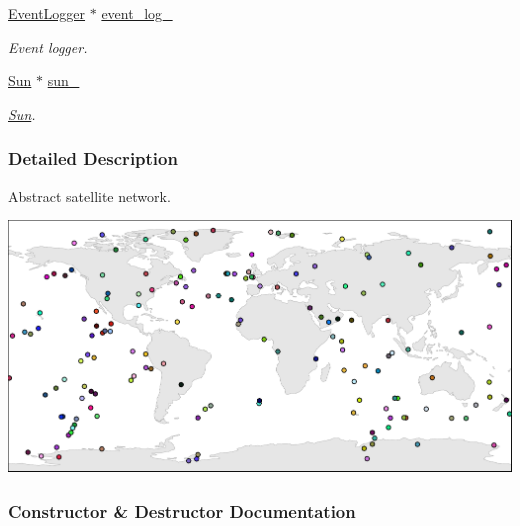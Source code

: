 \begin{DoxyCompactItemize}
\mbox{\label{classosse_1_1collaborate_1_1_observing_system_ac3f97c3eb20163b20076f35ce78175ee}} 
\hyperlink{classosse_1_1collaborate_1_1_event_logger}{Event\+Logger} $\ast$ \hyperlink{classosse_1_1collaborate_1_1_observing_system_ac3f97c3eb20163b20076f35ce78175ee}{event\+\_\+log\+\_\+}
\begin{DoxyCompactList}\small\item\em Event logger. \end{DoxyCompactList}\item 
\mbox{\label{classosse_1_1collaborate_1_1_observing_system_aa6de5a15a22658a10220b163ee1d21d0}} 
\hyperlink{classosse_1_1collaborate_1_1_sun}{Sun} $\ast$ \hyperlink{classosse_1_1collaborate_1_1_observing_system_aa6de5a15a22658a10220b163ee1d21d0}{sun\+\_\+}
\begin{DoxyCompactList}\small\item\em \hyperlink{classosse_1_1collaborate_1_1_sun}{Sun}. \end{DoxyCompactList}\end{DoxyCompactItemize}


\subsubsection{Detailed Description}
Abstract satellite network. 

 
\begin{DoxyImageNoCaption}
  \mbox{\includegraphics[width=\textwidth]{map}}
\end{DoxyImageNoCaption}
 

\subsubsection{Constructor \& Destructor Documentation}
\mbox{\label{classosse_1_1collaborate_1_1_observing_system_a9cde3752308908b32f882ea8c529e7e2}} 

